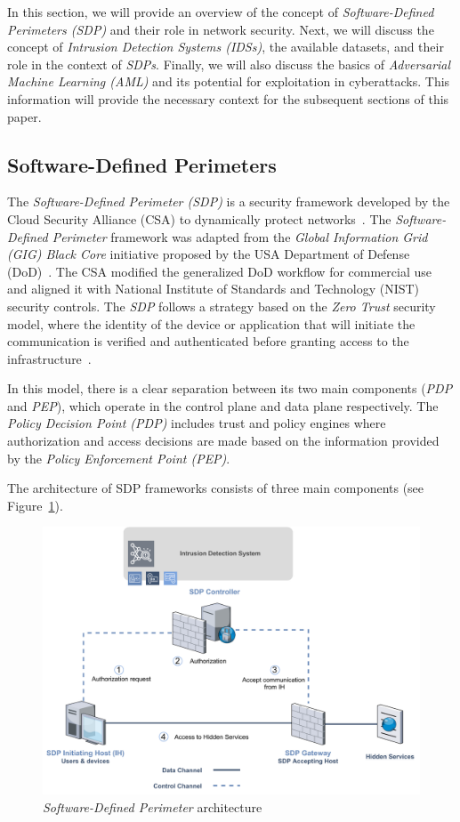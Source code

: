 In this section, we will provide an overview of the concept of \textit{Software-Defined Perimeters (SDP)} and their
role in network security.
Next, we will discuss the concept of \textit{Intrusion Detection Systems (IDSs)}, the available datasets, and their role
in the context of \textit{SDPs}.
Finally, we will also discuss the basics of \textit{Adversarial Machine Learning (AML)} and its potential for
exploitation in cyberattacks.
This information will provide the necessary context for the subsequent sections of this paper.

\subsection{Software-Defined Perimeters}\label{subsec:software-defined-perimeters}

The \textit{Software-Defined Perimeter (SDP)} is a security framework developed by the Cloud Security Alliance (CSA) to
dynamically protect networks~\cite{Koilpillai2020, Kumar2019}.
The \textit{Software-Defined Perimeter} framework was adapted from the \textit{Global Information Grid (GIG) Black Core}
initiative proposed by the USA Department of Defense (DoD)~\cite{Enterprise2007}.
The CSA modified the generalized DoD workflow for commercial use and aligned it with National Institute of Standards
and Technology (NIST) security controls.
The \textit{SDP} follows a strategy based on the \textit{Zero Trust} security model, where the identity of the device or
application that will initiate the communication is verified and authenticated before granting access to the
infrastructure~\cite{rose2020zero}.

In this model, there is a clear separation between its two main components (\textit{PDP} and \textit{PEP}),
which operate in the control plane and data plane respectively.
The \textit{Policy Decision Point (PDP)} includes trust and policy engines where authorization and access
decisions are made based on the information provided by the \textit{Policy Enforcement Point (PEP)}.

The architecture of SDP frameworks consists of three main components (see Figure~\ref{fig:sdp}).

\begin{figure}
    \centering
    \includegraphics[width=.7\textwidth]{Figures/SDP}
    \caption{\label{fig:sdp} \textit{Software-Defined Perimeter} architecture~\cite{CSAZeroTrust2020}}
\end{figure}


